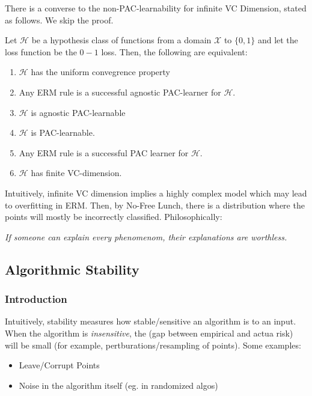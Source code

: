 \documentclass[11pt]{scrartcl}
\begin{document}
There is a converse to the non-PAC-learnability for infinite VC Dimension, stated as follows. We skip the proof.
\begin{thm}
Let $\mathcal{H}$ be a hypothesis class of functions from a domain $\mathcal{X}$ to $\{0,1\}$ and let the loss function be the $0-1$ loss. Then, the following are equivalent:
\begin{enumerate}
    \item $\mathcal{H}$ has the uniform convegrence property
    \item Any ERM rule is a successful agnostic PAC-learner for $\mathcal{H}$.
    \item $\mathcal{H}$ is agnostic PAC-learnable
    \item $\mathcal{H}$ is PAC-learnable. 
    \item Any ERM rule is a successful PAC learner for $\mathcal{H}$.
    \item $\mathcal{H}$ has finite VC-dimension.
\end{enumerate}
\end{thm}
Intuitively, infinite VC dimension implies a highly complex model which may lead to overfitting in ERM. Then, by No-Free Lunch, there is a distribution where the points will mostly be incorrectly classified. Philosophically:

\begin{center}
\textit{If someone can explain every phenomenom, their explanations are worthless.}
\end{center}

\subsection{Algorithmic Stability}
\subsubsection{Introduction}
Intuitively, stability measures how stable/sensitive an algorithm is to an input. When the algorithm is \textit{insensitive}, the  (gap between empirical and actua risk) will be small (for example, pertburations/resampling of points). Some examples:
\begin{itemize}
    \item Leave/Corrupt Points
    \item Noise in the algorithm itself (eg. in randomized algos)
\end{itemize}
\end{document}
